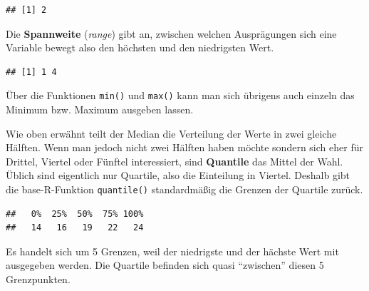 \documentclass[
]{book}
\newenvironment{Shaded}{\begin{snugshade}}{\end{snugshade}}
\newcommand{\AttributeTok}[1]{\textcolor[rgb]{0.77,0.63,0.00}{#1}}
\newcommand{\ConstantTok}[1]{\textcolor[rgb]{0.00,0.00,0.00}{#1}}
\newcommand{\FunctionTok}[1]{\textcolor[rgb]{0.00,0.00,0.00}{#1}}
\newcommand{\NormalTok}[1]{#1}
\newcommand{\SpecialCharTok}[1]{\textcolor[rgb]{0.00,0.00,0.00}{#1}}
\begin{document}
\begin{Shaded}
\end{Shaded}

\begin{verbatim}
## [1] 2
\end{verbatim}

Die \textbf{Spannweite} (\emph{range}) gibt an, zwischen welchen Ausprägungen sich eine Variable bewegt also den höchsten und den niedrigsten Wert.

\begin{Shaded}
\end{Shaded}

\begin{verbatim}
## [1] 1 4
\end{verbatim}

Über die Funktionen \texttt{min()} und \texttt{max()} kann man sich übrigens auch einzeln das Minimum bzw. Maximum ausgeben lassen.

Wie oben erwähnt teilt der Median die Verteilung der Werte in zwei gleiche Hälften. Wenn man jedoch nicht zwei Hälften haben möchte sondern sich eher für Drittel, Viertel oder Fünftel interessiert, sind \textbf{Quantile} das Mittel der Wahl. Üblich sind eigentlich nur Quartile, also die Einteilung in Viertel. Deshalb gibt die base-R-Funktion \texttt{quantile()} standardmäßig die Grenzen der Quartile zurück.

\begin{Shaded}
\end{Shaded}

\begin{verbatim}
##   0%  25%  50%  75% 100% 
##   14   16   19   22   24
\end{verbatim}

Es handelt sich um 5 Grenzen, weil der niedrigste und der hächste Wert mit ausgegeben werden. Die Quartile befinden sich quasi ``zwischen'' diesen 5 Grenzpunkten.
\end{document}
